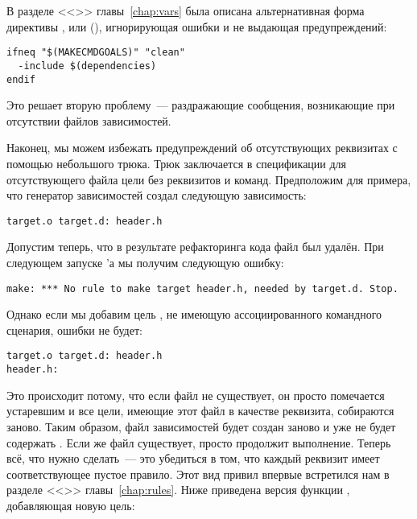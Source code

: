 В разделе <<>> главы~\ref{chap:vars}
была описана альтернативная форма директивы ,
 или (), игнорирующая ошибки и
не выдающая предупреждений:

{\footnotesize
\begin{verbatim}
ifneq "$(MAKECMDGOALS)" "clean"
  -include $(dependencies)
endif
\end{verbatim}
}

Это решает вторую проблему~--- раздражающие сообщения, возникающие при
отсутствии файлов зависимостей.

Наконец, мы можем избежать предупреждений об отсутствующих реквизитах
с помощью небольшого трюка. Трюк заключается в спецификации для
отсутствующего файла цели без реквизитов и команд. Предположим для
примера, что генератор зависимостей создал следующую зависимость:

{\footnotesize
\begin{verbatim}
target.o target.d: header.h
\end{verbatim}
}

Допустим теперь, что в результате рефакторинга кода файл
 был удалён. При следующем запуске \Makefile{}'а мы
получим следующую ошибку:

{\footnotesize
\begin{verbatim}
make: *** No rule to make target header.h, needed by target.d. Stop.
\end{verbatim}
}

Однако если мы добавим цель , не имеющую
ассоциированного командного сценария, ошибки не будет:

{\footnotesize
\begin{verbatim}
target.o target.d: header.h
header.h:
\end{verbatim}
}

Это происходит потому, что если файл  не
существует, он просто помечается устаревшим и все цели, имеющие этот
файл в качестве реквизита, собираются заново. Таким образом, файл
зависимостей будет создан заново и уже не будет содержать
. Если же файл  существует,
\GNUmake{} просто продолжит выполнение.  Теперь всё, что нужно
сделать~--- это убедиться в том, что каждый реквизит имеет
соответствующее пустое правило. Этот вид привил впервые встретился нам
в разделе <<>> главы~\ref{chap:rules}. Ниже
приведена версия функции , добавляющая новую
цель:

